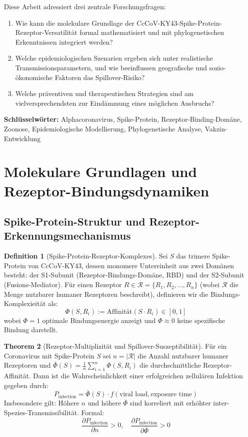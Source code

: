﻿\documentclass[11pt,a4paper]{article}
\theoremstyle{definition}
\newtheorem{theorem}{Theorem}[section]
\newtheorem{definition}[theorem]{Definition}
\begin{document}
Diese Arbeit adressiert drei zentrale Forschungsfragen:
\begin{enumerate}
\item Wie kann die molekulare Grundlage der CcCoV-KY43-Spike-Protein-Rezeptor-Versatilität formal mathematisiert und mit phylogenetischen Erkenntnissen integriert werden?
\item Welche epidemiologischen Szenarien ergeben sich unter realistische Transmissionsparametern, und wie beeinflussen geografische und sozio-ökonomische Faktoren das Spillover-Risiko?
\item Welche präventiven und therapeutischen Strategien sind am vielversprechendsten zur Eindämmung eines möglichen Ausbruchs?
\end{enumerate}

\textbf{Schlüsselwörter:} Alphacoronavirus, Spike-Protein, Rezeptor-Binding-Domäne, Zoonose, Epidemiologische Modellierung, Phylogenetische Analyse, Vakzin-Entwicklung

\section{Molekulare Grundlagen und Rezeptor-Bindungsdynamiken}

\subsection{Spike-Protein-Struktur und Rezeptor-Erkennungsmechanismus}

\begin{definition}[Spike-Protein-Rezeptor-Komplexes]
Sei $S$ das trimere Spike-Protein von CcCoV-KY43, dessen monomere Untereinheit aus zwei Domänen besteht: der S1-Subunit (Rezeptor-Bindungs-Domäne, RBD) und der S2-Subunit (Fusions-Mediator). Für einen Rezeptor $R \in \mathcal{R} = \{R_1, R_2, \ldots, R_n\}$ (wobei $\mathcal{R}$ die Menge nutzbarer humaner Rezeptoren beschreibt), definieren wir die Bindungs-Komplexieität als:
\[
\Phi(S, R_i) := \text{Affinität}(S \cdot R_i) \in [0, 1]
\]
wobei $\Phi = 1$ optimale Bindungsenergie anzeigt und $\Phi \approx 0$ keine spezifische Bindung darstellt.
\end{definition}

\begin{theorem}[Rezeptor-Multiplizität und Spillover-Suszeptibilität]
\label{thm:receptor_multiplicity}
Für ein Coronavirus mit Spike-Protein $S$ sei $n = |\mathcal{R}|$ die Anzahl nutzbarer humaner Rezeptoren und $\bar{\Phi}(S) = \frac{1}{n} \sum_{i=1}^{n} \Phi(S, R_i)$ die durchschnittliche Rezeptor-Affinität. Dann ist die Wahrscheinlichkeit einer erfolgreichen zellulären Infektion gegeben durch:
\[
P_{\text{infection}} = \bar{\Phi}(S) \cdot f(\text{viral load}, \text{exposure time})
\]
Insbesondere gilt: Höhere $n$ und höhere $\bar{\Phi}$ sind korreliert mit erhöhter inter-Spezies-Transmissibilität. Formal: 
\[
\frac{\partial P_{\text{infection}}}{\partial n} > 0, \quad \frac{\partial P_{\text{infection}}}{\partial \bar{\Phi}} > 0
\]
\end{theorem}
\end{document}
